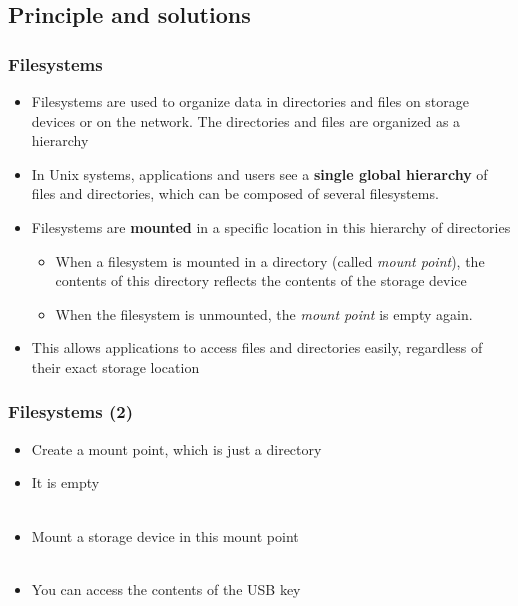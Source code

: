 \subsection{Principle and solutions}

\begin{frame}
  \frametitle{Filesystems}
  \begin{itemize}
  \item Filesystems are used to organize data in directories and files
    on storage devices or on the network. The directories and files
    are organized as a hierarchy
  \item In Unix systems, applications and users see a {\bf single
      global hierarchy} of files and directories, which can be
    composed of several filesystems.
  \item Filesystems are {\bf mounted} in a specific location in this
    hierarchy of directories
    \begin{itemize}
    \item When a filesystem is mounted in a directory (called {\em
        mount point}), the contents of this directory reflects the
      contents of the storage device
    \item When the filesystem is unmounted, the {\em mount point} is
      empty again.
    \end{itemize}
  \item This allows applications to access files and directories easily,
    regardless of their exact storage location
  \end{itemize}
\end{frame}

\begin{frame}
  \frametitle{Filesystems (2)}
  \begin{itemize}
  \item Create a mount point, which is just a directory\\
  \item It is empty\\
    \\
    \code{$}
  \item Mount a storage device in this mount point\\
    \\
    \code{$}
  \item You can access the contents of the USB key\\
    \\
    \\
    \code{$}
  \end{itemize}
\end{frame}

